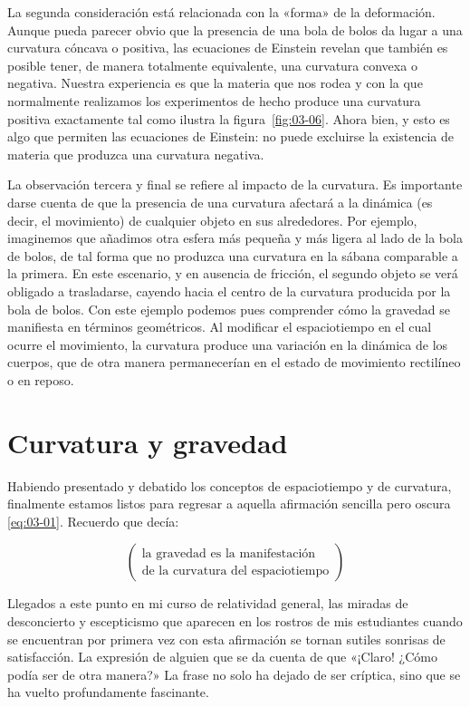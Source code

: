 La segunda consideración está relacionada con la «forma» de la deformación. Aunque pueda
parecer obvio que la presencia de una bola de bolos da lugar a una curvatura cóncava o
positiva, las ecuaciones de Einstein revelan que también es posible tener, de manera totalmente
equivalente, una curvatura convexa o negativa. Nuestra experiencia es que la materia que nos
rodea y con la que normalmente realizamos los experimentos de hecho produce una curvatura
positiva exactamente tal como ilustra la figura~\ref{fig:03-06}. Ahora bien, y esto es algo que
permiten las ecuaciones de Einstein: no puede excluirse la existencia de materia que produzca
una curvatura negativa.

La observación tercera y final se refiere al impacto de la curvatura. Es importante darse
cuenta de que la presencia de una curvatura afectará a la dinámica (es decir, el movimiento) de
cualquier objeto en sus alrededores. Por ejemplo, imaginemos que añadimos otra esfera más
pequeña y más ligera al lado de la bola de bolos, de tal forma que no produzca una curvatura en
la sábana comparable a la primera. En este escenario, y en ausencia de fricción, el segundo
objeto se verá obligado a trasladarse, cayendo hacia el centro de la curvatura producida por la
bola de bolos. Con este ejemplo podemos pues comprender cómo la gravedad se manifiesta en
términos geométricos. Al modificar el espaciotiempo en el cual ocurre el movimiento, la
curvatura produce una variación en la dinámica de los cuerpos, que de otra manera permanecerían
en el estado de movimiento rectilíneo o en reposo.

\section{Curvatura y gravedad}\label{sec:03-gravity}

Habiendo presentado y debatido los conceptos de espaciotiempo y de curvatura, finalmente
estamos listos para regresar a aquella afirmación sencilla pero oscura \eqref{eq:03-01}.
Recuerdo que decía:

\[
\begin{pmatrix}\text{la gravedad es la manifestación} \\ \text{de la curvatura del espaciotiempo}\end{pmatrix}
\]

Llegados a este punto en mi curso de relatividad general, las miradas de desconcierto y
escepticismo que aparecen en los rostros de mis estudiantes cuando se encuentran por primera
vez con esta afirmación se tornan sutiles sonrisas de satisfacción. La expresión de alguien que
se da cuenta de que «¡Claro! ¿Cómo podía ser de otra manera?» La frase no solo ha dejado de ser
críptica, sino que se ha vuelto profundamente fascinante.

